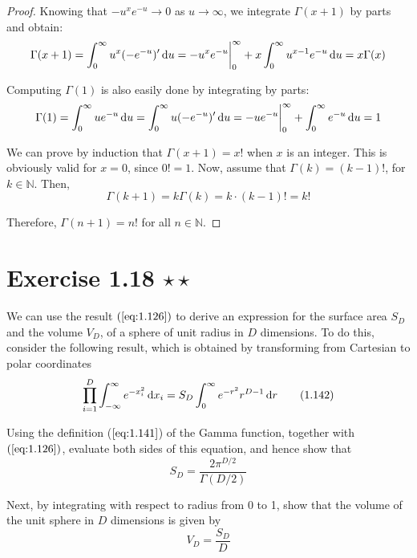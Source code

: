 \vspace{1em}

\begin{proof}
    Knowing that $-u^xe^{-u} \to 0$ as $u \to \infty$, 
    we integrate $\Gamma(x + 1)$ by parts and obtain:
     \[
         \Gamma(x+1) = \int_{0}^{\infty} u^x (-e^{-u})' \mathop{}\!\mathrm{d} u
         = -u^x e^{-u} \bigg|_0^\infty + x \int_{0}^\infty u^{x - 1} e^{-u} \mathop{}\!\mathrm{d} u
         = x\Gamma(x)
    \] 

    Computing $\Gamma(1)$ is also easily done by integrating by parts:
    \[
        \Gamma(1) = \int_{0}^{\infty} ue^{-u} \mathop{}\!\mathrm{d} u
        = \int_{0}^{\infty} u(-e^{-u})' \mathop{}\!\mathrm{d} u
        = -ue^{-u}\bigg|_0^\infty + \int_{0}^{\infty} e^{-u} \mathop{}\!\mathrm{d} u 
        = 1
    \] 

    We can prove by induction that $\Gamma(x + 1) = x!$ when $x$ 
    is an integer. This is obviously valid for $x = 0$, since $0! = 1$.
    Now, assume that $\Gamma(k) = (k - 1)!$, for $k \in \mathbb{N}$. Then,
     \[
         \Gamma(k + 1) = k\Gamma(k) = k \cdot (k - 1)! = k!
    \] 

    Therefore, $\Gamma(n + 1) = n!$ for all $n \in \mathbb{N}$.
\end{proof}

\section*{Exercise 1.18 $\star \star$}
We can use the result $(\ref{eq:1.126})$ to derive an expression for the
surface area $S_D$ and the volume $V_D$, of a sphere of unit radius in  
$D$ dimensions. To do this, consider the following result, which is obtained
by transforming from Cartesian to polar coordinates
\begin{equation*}
    \prod_{i = 1}^D \int_{-\infty}^{\infty} e^{-x_i^2} \mathop{}\!\mathrm{d} x_i 
    = S_D \int_{0}^{\infty} e^{-r^2} r^{D - 1} \mathop{}\!\mathrm{d} r 
    \tag{1.142}\label{eq:1.142}
\end{equation*}

Using the definition ($\ref{eq:1.141}$) of the Gamma function, together with
$(\ref{eq:1.126})$, evaluate both sides of this equation, and hence show that
\begin{equation*}
    S_D =\frac{2\pi^{D/2}}{\Gamma(D/2)}
    \tag{1.143}\label{eq:1.143}
\end{equation*}

Next, by integrating with respect to radius from 0 to 1, show that the volume
of the unit sphere in $D$ dimensions is given by
\begin{equation*}
    V_D = \frac{S_D}{D}
    \tag{1.144}\label{eq:1.144}
\end{equation*}


